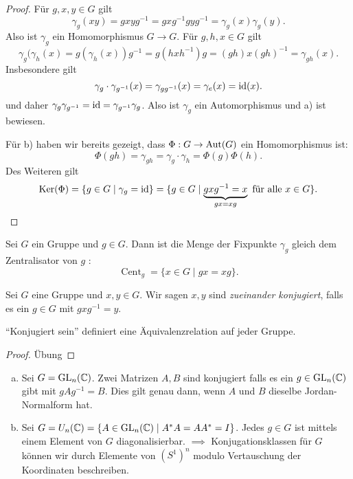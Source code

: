 \begin{proof}
	Für $g,x,y \in G$ gilt 
	\[
		\gamma_{g}(x y) = g x y g^{-1} = g x g^{-1} g y g^{-1} = \gamma_{g}(x) \gamma_{g}(y)
	.\]
	Also ist $\gamma_{g}$ ein Homomorphismus $G \to G$.
	Für $g,h,x \in G$ gilt 
	\[
		\gamma_{g}(\gamma_{h}(x) = g (\gamma_{h}(x)) g^{-1} = g (h x h^{-1}) g = (gh) x (gh)^{-1} = \gamma_{gh}(x)
	.\]
	Insbesondere gilt
	\[
		\gamma_{g} \cdot \gamma_{g^{-1}}(x) = \gamma_{g g^{-1}}(x) = \gamma_{e}(x) = \operatorname{id}(x)
	.\] 
	und daher $\gamma_{g} \gamma_{g^{-1}} = \operatorname{id} = \gamma_{g^{-1}} \gamma_{g}$.
	Also ist $\gamma_{g}$ ein Automorphismus und a) ist bewiesen.

	Für b) haben wir bereits gezeigt, dass $\Phi: G \to  \operatorname{Aut}(G)$ ein Homomorphismus ist:
	\[
		\Phi(gh) = \gamma_{gh} = \gamma_{g} \cdot \gamma_{h} = \Phi(g) \Phi(h)
	.\] 
	Des Weiteren gilt
	\[
		\operatorname{Ker}(\Phi) = \{g \in G \mid \gamma_{g} = \operatorname{id}\}  = \{g \in G \mid \underbrace{g x g^{-1} = x}_{gx = xg} \text{ für alle } x \in G\} 
	.\] 
\end{proof}

\begin{definition}
	Sei $G$ ein Gruppe und $g \in G$. Dann ist die Menge der Fixpunkte $\gamma_{g}$ gleich dem Zentralisator von $g$ :
	\[
		\operatorname{Cent}_{g} = \{x \in G \mid gx = xg\} 
	.\] 
\end{definition}

\begin{definition}
	Sei $G$ eine Gruppe und $x,y \in G$.
	Wir sagen $x,y$ sind \emph{zueinander konjugiert}, falls es ein $g \in G$ mit $g x g^{-1} = y$.
\end{definition}

\begin{lemma}
	\enquote{Konjugiert sein} definiert eine Äquivalenzrelation auf jeder Gruppe.
\end{lemma}

\begin{proof}
	Übung
\end{proof}

\begin{eg}
	\begin{enumerate}[a)]
		\item Sei $G = \operatorname{GL}_{n}(\mathbb{C})$. Zwei Matrizen $A,B$ sind konjugiert falls es ein $g \in \operatorname{GL}_{n}(\mathbb{C})$ gibt mit $g A g^{-1} = B$.
			Dies gilt genau dann, wenn $A$ und $B$ dieselbe Jordan-Normalform hat.
		\item Sei $G = U_{n}(\mathbb{C}) = \{A \in \operatorname{GL}_{n}(\mathbb{C}) \mid A^{*} A = A A^{*} = I\} $.
			Jedes $g \in G$ ist mittels einem Element von $G$ diagonalisierbar.
			$\implies$ Konjugationsklassen für $G$ können wir durch Elemente von $(S^{1})^{n}$ modulo Vertauschung der Koordinaten beschreiben.
	\end{enumerate}
\end{eg}

